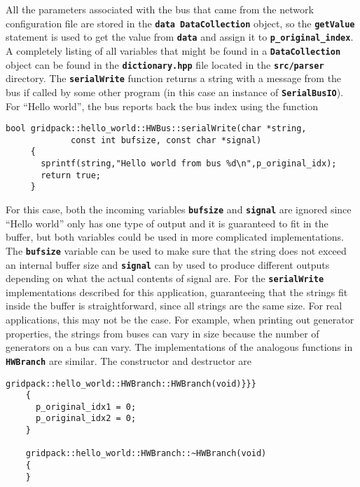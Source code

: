 All the parameters associated with the bus that came from the network
configuration file are stored in the \texttt{\textbf{data DataCollection}}
object, so the \texttt{\textbf{getValue}} statement is used to get the value
from \texttt{\textbf{data}} and assign it to
\texttt{\textbf{p\_original\_index}}. A completely listing of all variables that
might be found in a \texttt{\textbf{DataCollection}} object can be found in the
\texttt{\textbf{dictionary.hpp}} file located in the \texttt{\textbf{src/parser}} directory.
The \texttt{\textbf{serialWrite}} function returns a string with a message from the bus if called by some other program (in this case an instance of \texttt{\textbf{SerialBusIO}}). For ``Hello world'', the bus reports back the bus index using the function

{
\color{red}
\begin{Verbatim}[fontseries=b]
     bool gridpack::hello_world::HWBus::serialWrite(char *string,
             const int bufsize, const char *signal)
     {
       sprintf(string,"Hello world from bus %d\n",p_original_idx);
       return true;
     }
\end{Verbatim}
}

For this case, both the incoming variables \texttt{\textbf{bufsize}} and \texttt{\textbf{signal}} are ignored since ``Hello world'' only has one type of output and it is guaranteed to fit in the buffer, but both variables could be used in more complicated implementations. The \texttt{\textbf{bufsize}} variable can be used to make sure that the string does not exceed an internal buffer size and \texttt{\textbf{signal}} can by used to produce different outputs depending on what the actual contents of signal are. For the \texttt{\textbf{serialWrite}} implementations described for this application, guaranteeing that the strings fit inside the buffer  is straightforward, since all strings are the same size. For real applications, this may not be the case. For example, when printing out generator properties, the strings from buses can vary in size because the number of generators on a bus can vary.
The implementations of the analogous functions in \texttt{\textbf{HWBranch}} are similar. The constructor and destructor are

{
\color{red}
\begin{Verbatim}[fontseries=b]
    gridpack::hello_world::HWBranch::HWBranch(void)}}}
    {
      p_original_idx1 = 0;
      p_original_idx2 = 0;
    }

    gridpack::hello_world::HWBranch::~HWBranch(void)
    {
    }
\end{Verbatim}
}

